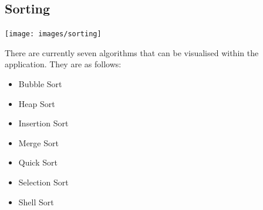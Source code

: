 \subsection{Sorting}
\begin{center}
    \texttt{[image: images/sorting]}
    \label{fig:main_page}
\end{center}

There are currently seven algorithms that can be visualised within the application. They are as follows:

\begin{itemize}
    \item Bubble Sort
    \item Heap Sort
    \item Insertion Sort
    \item Merge Sort
    \item Quick Sort
    \item Selection Sort
    \item Shell Sort
\end{itemize}

